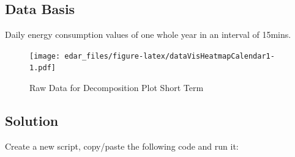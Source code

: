 \documentclass[
]{book}
\begin{document}
\hypertarget{data-basis-6}{%
\subsection{Data Basis}\label{data-basis-6}}

Daily energy consumption values of one whole year in an interval of 15mins.

\begin{figure}
\centering
\texttt{[image: edar\_files/figure-latex/dataVisHeatmapCalendar1-1.pdf]}
\caption{\label{fig:dataVisHeatmapCalendar1}Raw Data for Decomposition Plot Short Term}
\end{figure}

\hypertarget{solution-6}{%
\subsection{Solution}\label{solution-6}}

Create a new script, copy/paste the following code and run it:
\end{document}
